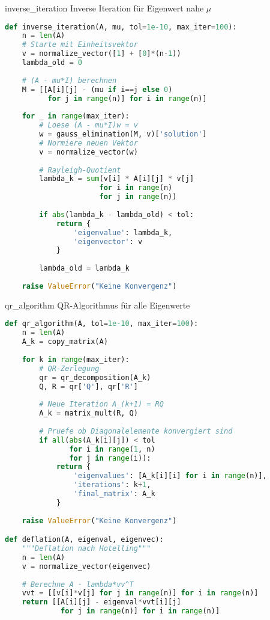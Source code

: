 \begin{examplecode}{inverse\_iteration} Inverse Iteration für Eigenwert nahe $\mu$
\begin{lstlisting}[language=Python, style=basesmol]
def inverse_iteration(A, mu, tol=1e-10, max_iter=100):
    n = len(A)
    # Starte mit Einheitsvektor
    v = normalize_vector([1] + [0]*(n-1))
    lambda_old = 0
    
    # (A - mu*I) berechnen
    M = [[A[i][j] - (mu if i==j else 0) 
          for j in range(n)] for i in range(n)]
    
    for _ in range(max_iter):
        # Loese (A - mu*I)w = v
        w = gauss_elimination(M, v)['solution']
        # Normiere neuen Vektor
        v = normalize_vector(w)
        
        # Rayleigh-Quotient
        lambda_k = sum(v[i] * A[i][j] * v[j] 
                      for i in range(n) 
                      for j in range(n))
        
        if abs(lambda_k - lambda_old) < tol:
            return {
                'eigenvalue': lambda_k,
                'eigenvector': v
            }
            
        lambda_old = lambda_k
        
    raise ValueError("Keine Konvergenz")
\end{lstlisting}
\end{examplecode}

\begin{examplecode}{qr\_algorithm} QR-Algorithmus für alle Eigenwerte
\begin{lstlisting}[language=Python, style=basesmol]
def qr_algorithm(A, tol=1e-10, max_iter=100):
    n = len(A)
    A_k = copy_matrix(A)
    
    for k in range(max_iter):
        # QR-Zerlegung
        qr = qr_decomposition(A_k)
        Q, R = qr['Q'], qr['R']
        
        # Neue Iteration A_(k+1) = RQ
        A_k = matrix_mult(R, Q)
        
        # Pruefe ob Diagonalelemente konvergiert sind
        if all(abs(A_k[i][j]) < tol 
               for i in range(1, n) 
               for j in range(i)):
            return {
                'eigenvalues': [A_k[i][i] for i in range(n)],
                'iterations': k+1,
                'final_matrix': A_k
            }
    
    raise ValueError("Keine Konvergenz")

def deflation(A, eigenval, eigenvec):
    """Deflation nach Hotelling"""
    n = len(A)
    v = normalize_vector(eigenvec)
    
    # Berechne A - lambda*vv^T
    vvt = [[v[i]*v[j] for j in range(n)] for i in range(n)]
    return [[A[i][j] - eigenval*vvt[i][j] 
             for j in range(n)] for i in range(n)]
\end{lstlisting}
\end{examplecode}